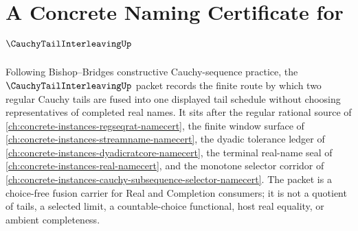 \chapter{A Concrete Naming Certificate for $\CauchyTailInterleavingUp$}
\label{ch:concrete-instances-cauchy-tail-interleaving-namecert}

Following Bishop--Bridges constructive Cauchy-sequence practice, the $\CauchyTailInterleavingUp$ packet records the finite route by which two regular Cauchy tails are fused into one displayed tail schedule without choosing representatives of completed real names. It sits after the regular rational source of \autoref{ch:concrete-instances-regseqrat-namecert}, the finite window surface of \autoref{ch:concrete-instances-streamname-namecert}, the dyadic tolerance ledger of \autoref{ch:concrete-instances-dyadicratcore-namecert}, the terminal real-name seal of \autoref{ch:concrete-instances-real-namecert}, and the monotone selector corridor of \autoref{ch:concrete-instances-cauchy-subsequence-selector-namecert}. The packet is a choice-free fusion carrier for Real and Completion consumers; it is not a quotient of tails, a selected limit, a countable-choice functional, host real equality, or ambient completeness.

